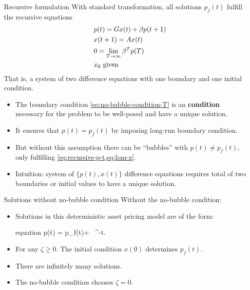 \documentclass[aspectratio=169,10pt]{beamer}
\newcommand{\emphcolor}[1]{\textbf{\textcolor{emphcolorval}{#1}}}
\begin{document}
\begin{frame}{Recursive formulation}
	With standard transformation, all solutions $p_f(t)$ fulfill the recursive equations
	\begin{align}
		\quad & p(t)  = G x(t) + \beta p(t+1)\label{eq:recursive-p-t}                            \\
		\quad & x(t+1)  = A x(t) \label{eq:lom-x}                                               \\
		\quad & 0    = \lim_{T \rightarrow \infty} \beta^T p(T) \label{eq:no-bubble-condition-T} \\
		\quad & x_0      \text{ given}\vspace{0.1in}\label{eq:initial-x0}
	\end{align}
	That is, a system of two difference equations with one boundary and one initial condition.
	\begin{itemize}
		\item The boundary condition \cref{eq:no-bubble-condition-T} is an \emphcolor{condition} necessary for the problem to be well-posed and have a unique solution.
		\item It ensures that $p(t) = p_f(t)$ by imposing long-run boundary condition.
		\item But without this assumption there can be ``bubbles'' with $p(t) \neq p_f(t)$, only fulfilling \cref{eq:recursive-p-t,eq:lom-x}.
		\item Intuition: system of $\{p(t), x(t)\}$ difference equations requires total of two boundaries or initial values to have a unique solution.
	\end{itemize}
	
\end{frame}


\begin{frame}{Solutions without no-bubble condition}
	Without the no-bubble condition:
	\begin{itemize}
		\item Solutions in this deterministic asset pricing model are of the form:
		\begin{empheq}[box=\tcbhighmath]{equation}
			p(t) = p_f(t)+\zeta~ \beta^{-t}. \label{eq:sol-seq-with-bubble}
		\end{empheq}
		\item For any $\zeta \geq 0$.  The initial condition $x(0)$ determines  $p_f(t)$.
		\item There are infinitely many solutions.  
		\item The no-bubble condition chooses  $\zeta = 0$.
	\end{itemize}
	
	
\end{frame}
\end{document}
